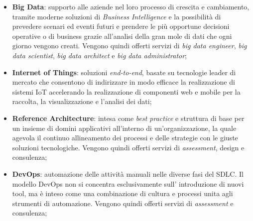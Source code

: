 \begin{itemize}
	\item \textbf{Big Data}: supporto alle aziende nel loro processo di crescita e cambiamento, tramite moderne soluzioni di \textit{Business Intelligence} e la possibilità di prevedere scenari ed eventi futuri e prendere le più opportune decisioni operative o di business grazie all'analisi della gran mole di dati che ogni giorno vengono creati. Vengono quindi offerti servizi di \textit{big data engineer}, \textit{big data scientist}, \textit{big data architect} e \textit{big data administrator};
	\item \textbf{Internet of Things}: soluzioni \textit{end-to-end}, basate su tecnologie leader di mercato che consentono di indirizzare in modo efficace la realizzazione di sistemi IoT accelerando la realizzazione di componenti web e mobile per la raccolta, la visualizzazione e l’analisi dei dati;
	\item \textbf{Reference Architecture}: intesa come \textit{best practice} e struttura di base per un insieme di domini applicativi all’interno di un’organizzazione, la quale agevola il continuo allineamento dei processi e delle strategie con le giuste soluzioni tecnologiche. Vengono quindi offerti servizi di \textit{assessment}, design e consulenza;
	\item \textbf{DevOps}: automazione delle attività manuali nelle diverse fasi del \gls{SDLC}. Il modello DevOps non si concentra esclusivamente sull’ introduzione di nuovi tool, ma è inteso come una combinazione di cultura e processi unita agli strumenti di automazione. Vengono quindi offerti servizi di \textit{assessment} e consulenza; 
	

\end{itemize}
